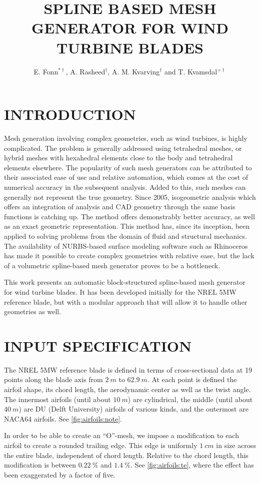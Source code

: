 \documentclass{nordic}
\title{SPLINE BASED MESH GENERATOR FOR WIND TURBINE BLADES}
\author{
  E. Fonn$^{*\dag}$,
  A. Rasheed$^\dag$,
  A. M. Kvarving$^\dag$ and
  T. Kvamsdal$^{+\dag}$
}
\begin{document}
\maketitle

\section{INTRODUCTION}
Mesh generation involving complex geometries, such as wind turbines, is highly
complicated. The problem is generally addressed using tetrahedral meshes, or
hybrid meshes with hexahedral elements close to the body and tetrahedral
elements elsewhere. The popularity of such mesh generators can be attributed to
their associated ease of use and relative automation, which comes at the cost of
numerical accuracy in the subsequent analysis. Added to this, such meshes can
generally not represent the true geometry. Since 2005, isogeometric analysis
which offers an integration of analysis and CAD geometry through the same basis
functions is catching up. The method offers demonstrably better accuracy, as
well as an exact geometric representation. This method has, since its inception,
been applied to solving problems from the domain of fluid and structural
mechanics. The availability of NURBS-based surface modeling software such as
Rhinoceros has made it possible to create complex geometries with relative ease,
but the lack of a volumetric spline-based mesh generator proves to be a
bottleneck.

This work presents an automatic block-structured spline-based mesh generator for
wind turbine blades. It has been developed initially for the NREL 5MW reference
blade, but with a modular approach that will allow it to handle other geometries
as well.

\section{INPUT SPECIFICATION}
The NREL 5MW reference blade\cite{Jonkman2009drw} is defined in terms of
cross-sectional data at 19 points along the blade axis from $\SI{2}{m}$ to
$\SI{62.9}{m}$. At each point is defined the airfoil shape, its chord length,
the aerodynamic center as well as the twist angle. The innermost airfoils (until
about $\SI{10}{m}$) are cylindrical, the middle (until about $\SI{40}{m}$) are
DU (Delft University) airfoils of various kinds, and the outermost are NACA64
airfoils. See \autoref{fig:airfoils:note}.

In order to be able to create an ``O''-mesh, we impose a modification to each
airfoil to create a rounded trailing edge. This edge is uniformly $\SI{1}{cm}$
in size across the entire blade, independent of chord length. Relative to the
chord length, this modification is between $\SI{0.22}{\percent}$ and
$\SI{1.4}{\percent}$. See \autoref{fig:airfoils:te}, where the effect has been
exaggerated by a factor of five.
\end{document}
